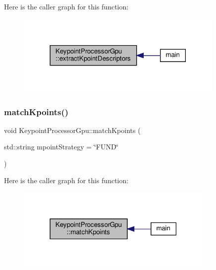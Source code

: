 Here is the caller graph for this function\+:\nopagebreak
\begin{figure}[H]
\begin{center}
\leavevmode
\includegraphics[width=285pt]{classKeypointProcessorGpu_a927a3d8480e8da505524c354e5c02c83_icgraph}
\end{center}
\end{figure}
\mbox{\label{classKeypointProcessorGpu_af195f83c19b58a9fedeb50ac3baaa8b3}} 
\subsubsection{\texorpdfstring{match\+Kpoints()}{matchKpoints()}}
{\footnotesize\ttfamily void Keypoint\+Processor\+Gpu\+::match\+Kpoints (\begin{DoxyParamCaption}\item[{std\+::string}]{mpoint\+Strategy = {\ttfamily \char`\"{}FUND\char`\"{}} }\end{DoxyParamCaption})}

Here is the caller graph for this function\+:\nopagebreak
\begin{figure}[H]
\begin{center}
\leavevmode
\includegraphics[width=271pt]{classKeypointProcessorGpu_af195f83c19b58a9fedeb50ac3baaa8b3_icgraph}
\end{center}
\end{figure}
\mbox{\label{classKeypointProcessorGpu_abdbb860bb800e122dee4c76fcf596fc5}} 

